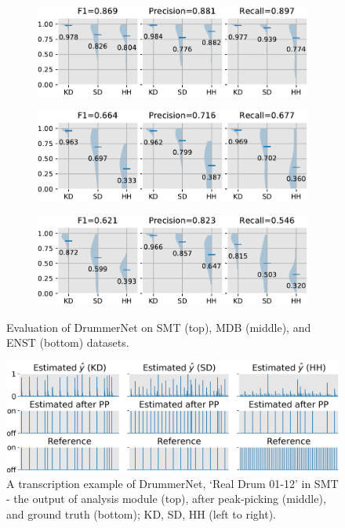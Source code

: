 \documentclass{article}
\begin{document}
	\begin{figure}[t] 
		\centering
		\begin{subfigure}{\columnwidth}
			\centering
			\includegraphics[width=\textwidth]{box_plot_SMT.pdf}
		\end{subfigure}
		
		\begin{subfigure}{\columnwidth}
			\centering
			\includegraphics[width=\textwidth]{box_plot_MDB.pdf}
		\end{subfigure}
		
		\begin{subfigure}{\columnwidth}
			\centering
			\includegraphics[width=\textwidth]{box_plot_ENST.pdf}
		\end{subfigure}
		\caption{Evaluation of DrummerNet on SMT (top), MDB (middle), and ENST (bottom) datasets.}
		\label{figure:all_results}
	\end{figure}   
	
	
	\begin{figure}[t]
		\centering
		\includegraphics[width=\columnwidth]{false_positives.png}
		\caption{A transcription example of DrummerNet, `Real Drum 01-12' in SMT - the output of analysis module (top), after peak-picking (middle), and ground truth (bottom); KD, SD, HH (left to right).}
		\label{fig:my_problems}
	\end{figure}
	
\end{document}
